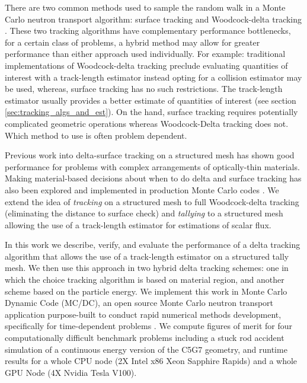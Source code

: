 There are two common methods used to sample the random walk in a Monte Carlo neutron transport algorithm: surface tracking \cite{lewis_computational_1984} and Woodcock-delta tracking \cite{woodcock_techniques_1965}.
These two tracking algorithms have complementary performance bottlenecks, for a certain class of problems, a hybrid method may allow for greater performance than either approach used individually.
For example: traditional implementations of Woodcock-delta tracking preclude evaluating quantities of interest with a track-length estimator instead opting for a collision estimator may be used, whereas, surface tracking has no such restrictions.
The track-length estimator usually provides a better estimate of quantities of interest (see section \ref{sec:tracking_algs_and_est}).
On the hand, surface tracking requires potentially complicated geometric operations whereas Woodcock-Delta tracking does not.
Which method to use is often problem dependent.


Previous work into delta-surface tracking on a structured mesh has shown good performance for problems with complex arrangements of optically-thin materials\cite{morgan2023delta}.
Making material-based decisions about when to do delta and surface tracking has also been explored and implemented in production Monte Carlo codes \cite{leppanen_development_2013conf, leppanen_2010_burnup, richards_monk_2015}.
We extend the idea of \textit{tracking} on a structured mesh to full Woodcock-delta tracking (eliminating the distance to surface check) and \textit{tallying} to a structured mesh allowing the use of a track-length estimator for estimations of scalar flux.

In this work we describe, verify, and evaluate the performance of a delta tracking algorithm that allows the use of a track-length estimator on a structured tally mesh.
We then use this approach in two hybrid delta tracking schemes: one in which the choice tracking algorithm is based on material region, and another scheme based on the particle energy.
We implement this work in Monte Carlo Dynamic Code (MC/DC), an open source Monte Carlo neutron transport application purpose-built to conduct rapid numerical methods development, specifically for time-dependent problems \cite{morgan_monte_2024}.
We compute figures of merit for four computationally difficult benchmark problems including a stuck rod accident simulation of a continuous energy version of the C5G7 geometry, and runtime results for a whole CPU node (2X Intel x86 Xeon Sapphire Rapids) and a whole GPU Node (4X Nvidia Tesla V100).

